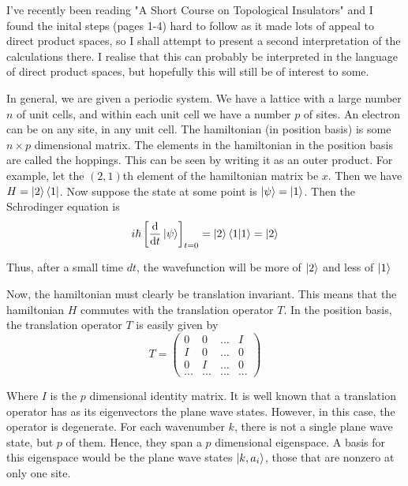 \documentclass[10pt]{article}
\begin{document}
I've recently been reading "A Short Course on Topological Insulators" and I found the inital steps (pages 1-4) hard to follow as it made lots of appeal to direct product spaces, so I shall attempt to present a second interpretation of the calculations there. I realise that this can probably be interpreted in the language of direct product spaces, but hopefully this will still be of interest to some.

In general, we are given a periodic system. We have a lattice with a large number $n$ of unit cells, and within each unit cell we have a number $p$ of sites. An electron can be on any site, in any unit cell. The hamiltonian (in position basis) is some $n\times p$ dimensional matrix. The elements in the hamiltonian in the position basis are called the hoppings. This can be seen by writing it as an outer product. For example, let the $(2,1)$th element of the hamiltonian matrix be $x$. Then we have $H=\ket{2}\bra{1}$. Now suppose the state at some point is $\ket{\psi}=\ket{1}$. Then the Schrodinger equation is
$$i\hbar\left[\dv{t}\ket{\psi}\right]_{t=0}=\ket{2}\braket{1}{1}=\ket{2}$$

Thus, after a small time $dt$, the wavefunction will be more of $\ket{2}$ and less of $\ket{1}$

Now, the hamiltonian must clearly be translation invariant. This means that the hamiltonian $H$ commutes with the translation operator $T$. In the position basis, the translation operator $T$ is easily given by
$$T = \begin{pmatrix}
0 & 0 & ... & I \\
I & 0 & ... & 0 \\
0 & I & ... & 0 \\
... & ... & ... & ...
\end{pmatrix}
$$

Where $I$ is the $p$ dimensional identity matrix. It is well known that a translation operator has as its eigenvectors the plane wave states. However, in this case, the operator is degenerate. For each wavenumber $k$, there is not a single plane wave state, but $p$ of them. Hence, they span a $p$ dimensional eigenspace. A basis for this eigenspace would be the plane wave states $\ket{k,a_i}$, those that are nonzero at only one site.
\end{document}
